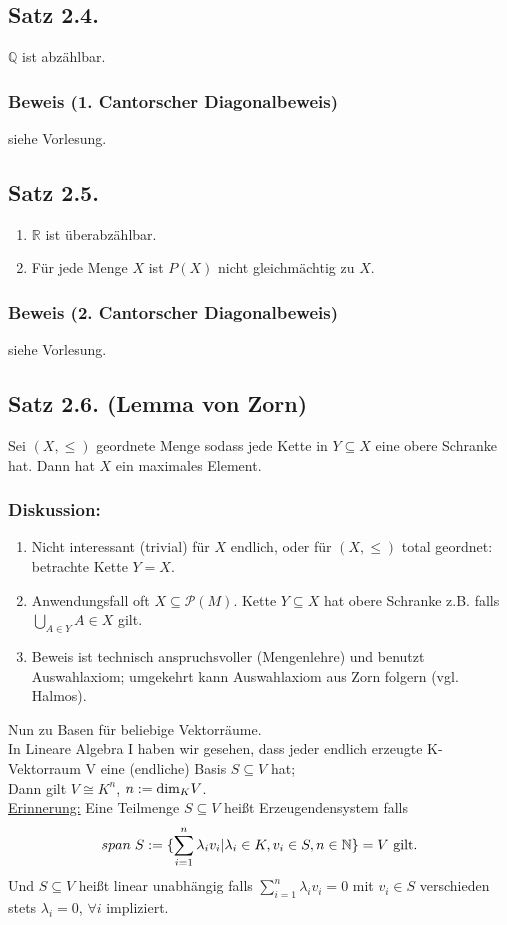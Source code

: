 \documentclass[a4paper, 12pt]{extarticle}
\newcommand{\tn}[1]{\textnormal {#1}}
\begin{document}
\subsection*{Satz 2.4.}
$\mathbb{Q}$ ist abzählbar.
\subsubsection*{Beweis (1. Cantorscher Diagonalbeweis)}
siehe Vorlesung.

\subsection*{Satz 2.5.}
\begin{enumerate}[label=(\alph*)]
\item $\mathbb{R}$ ist überabzählbar.
\item Für jede Menge $X$ ist $P(X)$ nicht gleichmächtig zu $X$.
\end{enumerate}
\subsubsection*{Beweis (2. Cantorscher Diagonalbeweis)}
siehe Vorlesung.
\subsection*{Satz 2.6. (Lemma von Zorn)}
Sei $(X, \leq)$ geordnete Menge sodass jede Kette in $Y \subseteq X$ eine obere Schranke hat. Dann hat $X$ ein maximales Element.\\
\subsubsection*{Diskussion:}
\begin{enumerate}[label=(\arabic*)]
\item Nicht interessant (trivial) für $X$ endlich, oder für $(X,\leq )$ total geordnet: betrachte Kette $Y=X$.
\item Anwendungsfall oft $X\subseteq \mathcal P(M)$. Kette $Y\subseteq X$ hat obere Schranke z.B. 
falls $\bigcup_{A\in Y}A\in X$ gilt.
\item Beweis ist technisch anspruchsvoller (Mengenlehre) und benutzt Auswahlaxiom; umgekehrt kann Auswahlaxiom aus Zorn folgern (vgl. Halmos).
\end{enumerate}
Nun zu Basen für beliebige Vektorräume. \\
In Lineare Algebra I haben wir gesehen, dass jeder endlich erzeugte K-Vektorraum V eine (endliche) Basis $S\subseteq V$ hat; \\
Dann gilt $V\cong K^n$, $n:=\tn{dim}_KV$.\\
\underline{Erinnerung:} Eine Teilmenge $S\subseteq V$ heißt Erzeugendensystem falls 
$$span \hspace*{1mm} S := \{\sum_{i=1}^n
\lambda_i v_i | \lambda_i \in K, v_i \in S, n \in \mathbb N\} = V \tn{ gilt.}$$
Und $S\subseteq V$ heißt linear unabhängig falls $\sum_{i=1}^n \lambda_i v_i = 0$ mit $v_i\in S$ verschieden stets $\lambda_i = 0$, $\forall i$ impliziert.
\end{document}
